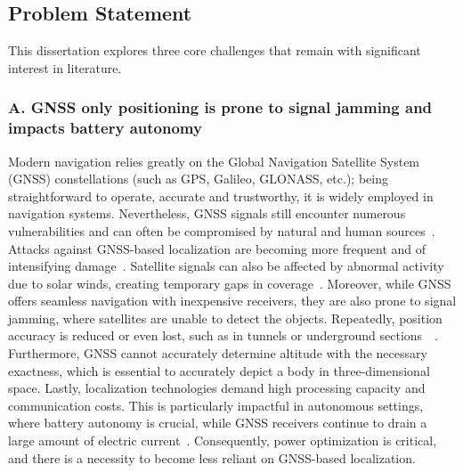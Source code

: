 \subsection{Problem Statement}
This dissertation explores three core challenges that remain with significant interest in literature.

\subsubsection{A. GNSS only positioning is prone to signal jamming and impacts battery autonomy}
Modern navigation relies greatly on the Global Navigation Satellite System (GNSS) constellations (such as GPS, Galileo, GLONASS, etc.); being straightforward to operate, accurate and trustworthy, it is widely employed in navigation systems. Nevertheless, GNSS signals still encounter numerous vulnerabilities and can often be compromised by natural and human sources~\cite{ioannides2016known}. Attacks against GNSS-based localization are becoming more frequent and of intensifying damage~\cite{papadimitratos2008protection}. Satellite signals can also be affected by abnormal activity due to solar winds, creating temporary gaps in coverage~\cite{amin2016vulnerabilities}.
Moreover, while GNSS offers seamless navigation with inexpensive receivers, they are also prone to signal jamming, where satellites are unable to detect the objects. Repeatedly, position accuracy is reduced or even lost, such as in tunnels or underground sections~\cite{pinker1999vulnerability}~\cite{omar2016integration}. Furthermore, GNSS cannot accurately determine altitude with the necessary exactness, which is essential to accurately depict a body in three-dimensional space.
Lastly, localization technologies demand high processing capacity and communication costs. This is particularly impactful in autonomous settings, where battery autonomy is crucial, while GNSS receivers continue to drain a large amount of electric current~\cite{lo2016greener}. Consequently, power optimization is critical, and there is a necessity to become less reliant on GNSS-based localization.



